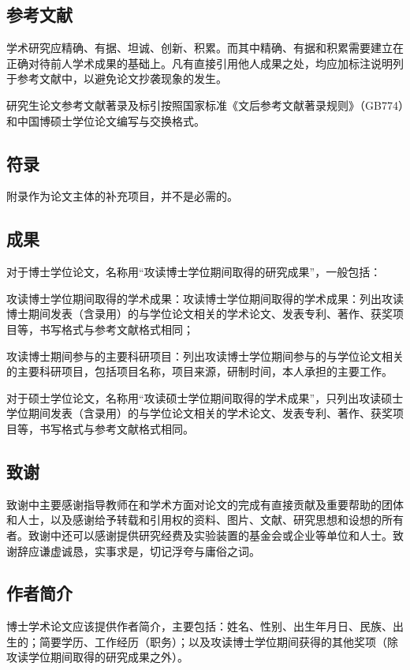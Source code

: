 \subsection{参考文献}

学术研究应精确、有据、坦诚、创新、积累。而其中精确、有据和积累需要建立在正确对待前人学术成果的基础上。凡有直接引用他人成果之处，均应加标注说明列于参考文献中，以避免论文抄袭现象的发生。

研究生论文参考文献著录及标引按照国家标准《文后参考文献著录规则》（GB774）和中国博硕士学位论文编写与交换格式。

\subsection{符录}

附录作为论文主体的补充项目，并不是必需的。

\subsection{成果}

对于博士学位论文，名称用“攻读博士学位期间取得的研究成果”，一般包括：

攻读博士学位期间取得的学术成果：攻读博士学位期间取得的学术成果：列出攻读博士期间发表（含录用）的与学位论文相关的学术论文、发表专利、著作、获奖项目等，书写格式与参考文献格式相同；

攻读博士期间参与的主要科研项目：列出攻读博士学位期间参与的与学位论文相关的主要科研项目，包括项目名称，项目来源，研制时间，本人承担的主要工作。

对于硕士学位论文，名称用“攻读硕士学位期间取得的学术成果”，只列出攻读硕士学位期间发表（含录用）的与学位论文相关的学术论文、发表专利、著作、获奖项目等，书写格式与参考文献格式相同。

\subsection{致谢}
致谢中主要感谢指导教师在和学术方面对论文的完成有直接贡献及重要帮助的团体和人士，以及感谢给予转载和引用权的资料、图片、文献、研究思想和设想的所有者。致谢中还可以感谢提供研究经费及实验装置的基金会或企业等单位和人士。致谢辞应谦虚诚恳，实事求是，切记浮夸与庸俗之词。

\subsection{作者简介}

博士学术论文应该提供作者简介，主要包括：姓名、性别、出生年月日、民族、出生的；简要学历、工作经历（职务）；以及攻读博士学位期间获得的其他奖项（除攻读学位期间取得的研究成果之外）。
